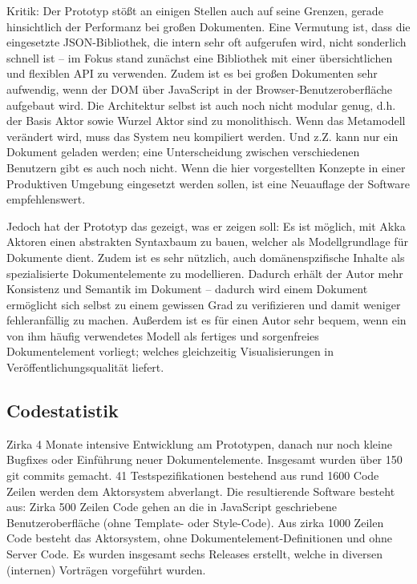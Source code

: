Kritik: Der Prototyp stößt an einigen Stellen auch auf seine Grenzen, gerade hinsichtlich der Performanz bei großen Dokumenten. Eine Vermutung ist, dass die eingesetzte JSON-Bibliothek, die intern sehr oft aufgerufen wird, nicht sonderlich schnell ist --  im Fokus stand zunächst eine Bibliothek mit einer übersichtlichen und flexiblen API zu verwenden. Zudem ist es bei großen Dokumenten sehr aufwendig, wenn der DOM über JavaScript in der Browser-Benutzeroberfläche aufgebaut wird. Die Architektur selbst ist auch noch nicht modular genug, d.h. der Basis Aktor sowie Wurzel Aktor sind zu monolithisch. Wenn das Metamodell verändert wird, muss das System neu kompiliert werden. Und z.Z. kann nur ein Dokument geladen werden; eine Unterscheidung zwischen verschiedenen Benutzern gibt es auch noch nicht. Wenn die hier vorgestellten Konzepte in einer Produktiven Umgebung eingesetzt werden sollen, ist eine Neuauflage der Software empfehlenswert.

 
Jedoch hat der Prototyp das gezeigt, was er zeigen soll: Es ist möglich, mit Akka Aktoren einen abstrakten Syntaxbaum zu bauen, welcher als Modellgrundlage für Dokumente dient. Zudem ist es sehr nützlich, auch domänenspzifische Inhalte als spezialisierte Dokumentelemente zu modellieren. Dadurch erhält der Autor mehr Konsistenz und Semantik im Dokument -- dadurch wird einem Dokument ermöglicht sich selbst zu einem gewissen Grad zu verifizieren und damit weniger fehleranfällig zu machen. Außerdem ist es für einen Autor sehr bequem, wenn ein von ihm häufig verwendetes Modell als fertiges und sorgenfreies Dokumentelement vorliegt; welches gleichzeitig Visualisierungen in Veröffentlichungsqualität liefert.

 
\subsection{Codestatistik}\label{}
 
Zirka 4 Monate intensive Entwicklung am Prototypen, danach nur noch kleine Bugfixes oder Einführung neuer Dokumentelemente. Insgesamt wurden über 150 git commits gemacht. 41 Testspezifikationen bestehend aus rund 1600 Code Zeilen werden dem Aktorsystem abverlangt. Die resultierende Software besteht aus: Zirka 500 Zeilen Code gehen an die in JavaScript geschriebene Benutzeroberfläche (ohne Template- oder Style-Code). Aus zirka 1000 Zeilen Code besteht das Aktorsystem, ohne Dokumentelement-Definitionen und ohne Server Code. Es wurden insgesamt sechs Releases erstellt, welche in diversen (internen) Vorträgen vorgeführt wurden.

